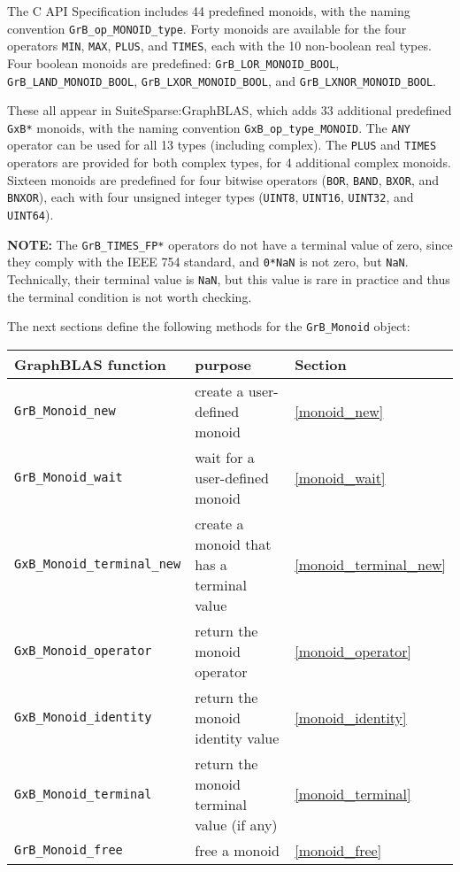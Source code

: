 \documentclass[12pt]{article}
\begin{document}
{%
The C API Specification includes 44 predefined monoids, with the naming
convention \verb'GrB_op_MONOID_type'.  Forty monoids are available for the four
operators \verb'MIN', \verb'MAX', \verb'PLUS', and \verb'TIMES', each with the
10 non-boolean real types.  Four boolean monoids are predefined:
\verb'GrB_LOR_MONOID_BOOL', \verb'GrB_LAND_MONOID_BOOL',
\verb'GrB_LXOR_MONOID_BOOL', and \verb'GrB_LXNOR_MONOID_BOOL'.

These all appear in SuiteSparse:GraphBLAS, which adds 33 additional predefined
\verb'GxB*' monoids, with the naming convention \verb'GxB_op_type_MONOID'.  The
\verb'ANY' operator can be used for all 13 types (including complex).  The
\verb'PLUS' and \verb'TIMES' operators are provided for both complex types, for
4 additional complex monoids.  Sixteen monoids are predefined for four bitwise
operators (\verb'BOR', \verb'BAND', \verb'BXOR', and \verb'BNXOR'), each with
four unsigned integer types (\verb'UINT8', \verb'UINT16', \verb'UINT32', and
\verb'UINT64').

{\bf NOTE:}
The \verb'GrB_TIMES_FP*' operators do not have a terminal value of zero, since
they comply with the IEEE 754 standard, and \verb'0*NaN' is not zero, but
\verb'NaN'.  Technically, their terminal value is \verb'NaN', but this value is
rare in practice and thus the terminal condition is not worth checking.

The next sections define the following methods for the \verb'GrB_Monoid'
object:

\vspace{0.2in}
{\footnotesize
\begin{tabular}{lll}
\hline
GraphBLAS function   & purpose                                      & Section \\
\hline
\verb'GrB_Monoid_new'       & create a user-defined monoid                  & \ref{monoid_new} \\
\verb'GrB_Monoid_wait'      & wait for a user-defined monoid                & \ref{monoid_wait} \\
\verb'GxB_Monoid_terminal_new'  & create a monoid that has a terminal value & \ref{monoid_terminal_new} \\
\verb'GxB_Monoid_operator'  & return the monoid operator                    & \ref{monoid_operator} \\
\verb'GxB_Monoid_identity'  & return the monoid identity value              & \ref{monoid_identity} \\
\verb'GxB_Monoid_terminal'  & return the monoid terminal value (if any)     & \ref{monoid_terminal} \\
\verb'GrB_Monoid_free'      & free a monoid                                 & \ref{monoid_free} \\
\hline
\end{tabular}
}
\vspace{0.2in}

}
\end{document}
